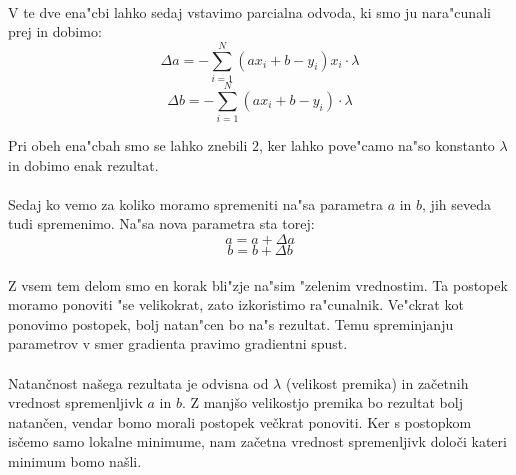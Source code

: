 \paragraph{}
V te dve ena"cbi lahko sedaj vstavimo parcialna odvoda, ki smo ju nara"cunali prej in dobimo:
\[\Delta a = -\sum_{i=1}^{N} (a x_i + b - y_i)x_i \cdot \lambda \]
\[\Delta b = -\sum_{i=1}^{N} (a x_i + b - y_i) \cdot \lambda \]

Pri obeh ena"cbah smo se lahko znebili $2$, ker lahko pove"camo na"so konstanto $\lambda$ in dobimo enak rezultat.

\paragraph{}
Sedaj ko vemo za koliko moramo spremeniti na"sa parametra $a$ in $b$, jih seveda tudi spremenimo. Na"sa nova parametra sta torej:
\[a = a + \Delta a \]
\[b = b + \Delta b \]

\paragraph{}
Z vsem tem delom smo en korak bli"zje na"sim "zelenim vrednostim. Ta postopek moramo ponoviti "se velikokrat, zato izkoristimo ra"cunalnik. Ve"ckrat kot ponovimo postopek, bolj natan"cen bo na"s rezultat. Temu spreminjanju parametrov v smer gradienta pravimo gradientni spust.

\paragraph{}
Natančnost našega rezultata je odvisna od $\lambda$ (velikost premika) in začetnih vrednost spremenljivk $a$ in $b$. Z manjšo velikostjo premika bo rezultat bolj natančen, vendar bomo morali postopek večkrat ponoviti. Ker s postopkom isčemo samo lokalne minimume, nam začetna vrednost spremenljivk določi kateri minimum bomo našli.
